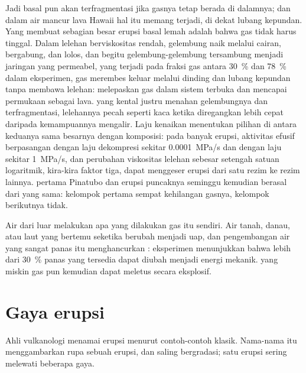 Jadi basal pun akan terfragmentasi jika gasnya tetap berada di dalamnya; dan dalam air mancur lava
Hawaii hal itu memang terjadi, di dekat lubang kepundan. Yang membuat sebagian besar erupsi basal lemah adalah bahwa
gas tidak harus tinggal. Dalam lelehan berviskositas rendah, gelembung naik melalui
cairan, bergabung, dan lolos, dan begitu gelembung-gelembung tersambung menjadi jaringan yang permeabel,
yang terjadi pada fraksi gas antara \qty{30}{\percent} dan \qty{78}{\percent}
dalam eksperimen, gas merembes keluar melalui dinding dan lubang kepundan tanpa membawa
lelehan:  melepaskan gas dalam sistem terbuka dan mencapai permukaan sebagai
lava.  yang kental justru menahan gelembungnya dan terfragmentasi, lelehannya pecah
seperti kaca ketika diregangkan lebih cepat daripada kemampuannya mengalir. Laju kenaikan menentukan
pilihan di antara keduanya sama besarnya dengan komposisi: pada banyak erupsi, aktivitas efusif
berpasangan dengan laju dekompresi sekitar \qty{0.0001}{MPa/s} dan 
dengan laju sekitar \qty{1}{MPa/s}, dan perubahan viskositas lelehan sebesar setengah
satuan logaritmik, kira-kira faktor tiga, dapat menggeser erupsi dari satu rezim ke
rezim lainnya.  pertama Pinatubo dan erupsi puncaknya seminggu kemudian
berasal dari  yang sama: kelompok pertama sempat kehilangan gasnya, kelompok berikutnya tidak.

Air dari luar melakukan apa yang dilakukan gas  itu sendiri. Air tanah, danau, atau
laut yang bertemu  seketika berubah menjadi uap, dan pengembangan air yang
sangat panas itu menghancurkan : eksperimen menunjukkan bahwa lebih dari \qty{30}{\percent}
panas yang tersedia dapat diubah menjadi energi mekanik.  yang miskin gas pun
kemudian dapat meletus secara eksplosif.

\section{Gaya erupsi}

Ahli vulkanologi menamai erupsi menurut contoh-contoh klasik. Nama-nama itu menggambarkan rupa
sebuah erupsi, dan saling bergradasi; satu erupsi sering melewati
beberapa gaya.

